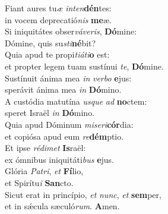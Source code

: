 \evenverse Fiant aures tu\textit{æ} \textit{in}\textit{ten}\textbf{dén}tes:~\*\\
\evenverse in vocem deprecatió\textit{nis} \textbf{me}æ.\\
\oddverse Si iniquitátes obser\textit{vá}\textit{ve}\textit{ris}, \textbf{Dó}mine:~\*\\
\oddverse Dómine, quis su\textit{sti}\textbf{né}bit?\\
\evenverse Quia apud te propi\textit{ti}\textit{á}\textit{ti}\textbf{o} est:~\*\\
\evenverse et propter legem tuam sustínui \textit{te}, \textbf{Dó}mine.\\
\oddverse Sustínuit ánima mea \textit{in} \textit{ver}\textit{bo} \textbf{e}jus:~\*\\
\oddverse sperávit ánima mea \textit{in} \textbf{Dó}mino.\\
\evenverse A custódia matutína \textit{us}\textit{que} \textit{ad} \textbf{no}ctem:~\*\\
\evenverse speret Israël \textit{in} \textbf{Dó}mino.\\
\oddverse Quia apud Dóminum \textit{mi}\textit{se}\textit{ri}\textbf{cór}dia:~\*\\
\oddverse et copiósa apud eum \textit{re}\textbf{dém}ptio.\\
\evenverse Et ipse \textit{ré}\textit{di}\textit{met} \textbf{Is}raël:~\*\\
\evenverse ex ómnibus iniquitáti\textit{bus} \textbf{e}jus.\\
\oddverse Glória \textit{Pa}\textit{tri}, \textit{et} \textbf{Fí}lio,~\*\\
\oddverse et Spirítu\textit{i} \textbf{San}cto.\\
\evenverse Sicut erat in princípio, \textit{et} \textit{nunc}, \textit{et} \textbf{sem}per,~\*\\
\evenverse et in sǽcula sæculó\textit{rum}. \textbf{A}men.\\
